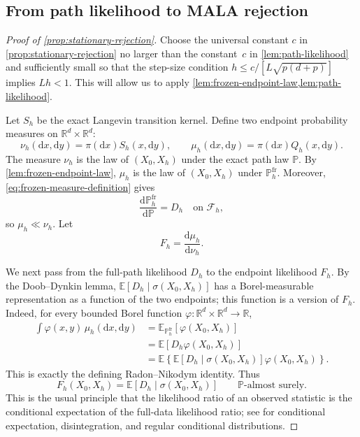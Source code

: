 \documentclass[11pt]{article}
\newcommand{\R}{\mathbb R}
\newcommand{\E}{\mathbb E}
\newcommand{\1}{\mathbf 1}
\newcommand{\df}{\mathrm{d}}
\begin{document}
	
	\subsection{From path likelihood to MALA rejection}
	
	\begin{proof}[Proof of \cref{prop:stationary-rejection}]
		
		Choose the universal constant \(c\) in
		\cref{prop:stationary-rejection} no larger than the constant~$c$ in
		\cref{lem:path-likelihood} and sufficiently small so that the step-size
		condition $h \leq c/[L\sqrt{p(d+p)}]$ implies \(Lh<1\).
		This will allow us to apply \cref{lem:frozen-endpoint-law,lem:path-likelihood}.
		
		Let \(S_h\) be the exact Langevin transition kernel.  Define two endpoint
		probability measures on \(\R^d\times\R^d\):
		\begin{equation*}
			\nu_h(\df x,\df y)=\pi(\df x)S_h(x,\df y),
			\qquad
			\mu_h(\df x,\df y)=\pi(\df x)Q_h(x,\df y).
		\end{equation*}
		The measure \(\nu_h\) is the law of \((X_0,X_h)\) under the exact path law
		\(\mathbb P\).  By \cref{lem:frozen-endpoint-law}, \(\mu_h\) is the law of
		\((X_0,X_h)\) under \(\mathbb P_h^{\mathrm{fr}}\).  Moreover,
		\eqref{eq:frozen-measure-definition} gives
		\[
		\frac{\df\mathbb P_h^{\mathrm{fr}}}{\df\mathbb P}=D_h
		\quad\text{on }\mathcal F_h,
		\]
		so \(\mu_h\ll\nu_h\).  Let
		\[
		F_h=\frac{\df\mu_h}{\df\nu_h}.
		\]
		
		We next pass from the full-path likelihood \(D_h\) to the endpoint likelihood
		\(F_h\).  By the Doob--Dynkin lemma,
		\(\E[D_h\mid\sigma(X_0,X_h)]\) has a Borel-measurable representation as a
		function of the two endpoints; this function is a version of \(F_h\).  Indeed,
		for every bounded Borel function
		\(\varphi:\R^d\times\R^d\to\R\),
		\begin{align*}
			\int\varphi(x,y)\,\mu_h(\df x,\df y)
			&=\E_{\mathbb P_h^{\mathrm{fr}}}[\varphi(X_0,X_h)]\\
			&=\E[D_h\varphi(X_0,X_h)]\\
			&=\E\left\{
			\E[D_h\mid\sigma(X_0,X_h)]
			\varphi(X_0,X_h)
			\right\}.
		\end{align*}
		This is exactly the defining Radon--Nikodym identity.  Thus
		\begin{equation}\label{eq:endpoint-conditioning}
			F_h(X_0,X_h)
			=\E[D_h\mid\sigma(X_0,X_h)]
			\qquad \mathbb P\text{-almost surely}.
		\end{equation}
		This is the usual principle that the likelihood ratio of an observed
		statistic is the conditional expectation of the full-data likelihood ratio;
		see \citet{Kallenberg2021} for conditional expectation, disintegration, and
		regular conditional distributions.
		

\end{proof}
\end{document}
